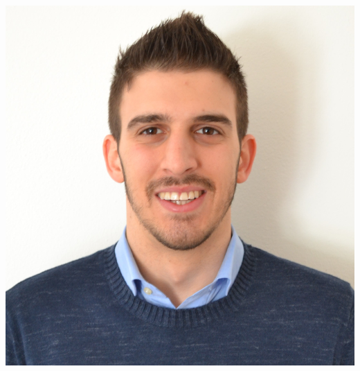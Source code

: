 \documentclass[9pt]{developercv} %
\begin{document}
\hfill
\begin{minipage}[t]{0.20\textwidth} %
	\vspace{-\baselineskip} %
		\hfill
	\includegraphics[width=1.0\linewidth]{../shared/Fototessera.jpg}
\end{minipage}
%
%
%
\end{document}
